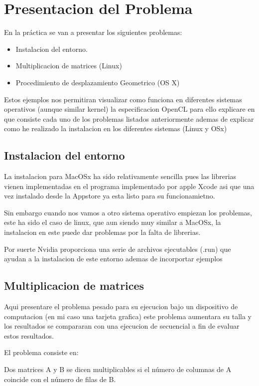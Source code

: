 \chapter{Presentacion del Problema}

En la práctica se van a presentar los siguientes problemas:
\begin{itemize}
	\item Instalacion del entorno.
	\item Multiplicacion de matrices  (Linux)
	\item Procedimiento de desplazamiento Geometrico (OS X)
\end{itemize}

Estos ejemplos nos permitiran visualizar como funciona en diferentes sistemas operativos (aunque similar kernel) la especificacion OpenCL para ello explicare en que consiste cada uno de los problemas listados anteriormente ademas de explicar como he realizado la instalacion en los diferentes sistemas (Linux y OSx)

\section{Instalacion del entorno}

La instalacion para MacOSx ha sido relativamente sencilla pues las librerias vienen implementadas en el programa implementado por apple Xcode asi que una vez instalado desde la Appstore ya esta listo para su funcionamietno.

Sin embargo cuando nos vamos a otro sistema operativo empiezan los problemas, este ha sido el caso de linux, que aun siendo muy similar a MacOSx, la instalacion en este puede dar problemas por la falta de librerias.

Por suerte Nvidia proporciona una serie de archivos ejecutables (.run) que ayudan a la instalacion de este entorno ademas de incorportar ejemplos 

\section{Multiplicacion de matrices}

Aqui presentare el problema pesado para su ejecucion bajo un dispositivo de computacion (en mi caso una tarjeta grafica) este problema aumentara su talla y los resultados se compararan con una ejecucion de secuencial a fin de evaluar estos resultados.

El problema consiste en:

Dos matrices A y B se dicen multiplicables si el número de columnas de A coincide con el número de filas de B.

